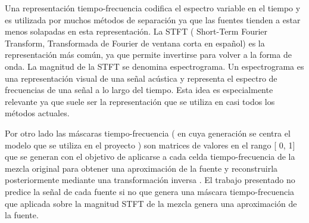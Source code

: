 Una representación tiempo-frecuencia codifica el espectro variable en el tiempo y es utilizada por muchos métodos de separación ya que las fuentes tienden a estar menos solapadas en esta representación.
La STFT ( Short-Term Fourier Transform, Transformada de Fourier de ventana corta en español) es la representación más común, ya que permite invertirse para volver a la forma de onda.
La magnitud de la STFT se denomina espectrograma. Un espectrograma es una representación visual de una señal acústica y representa el espectro de frecuencias de una señal a lo largo del tiempo.
Esta idea es especialmente relevante ya que suele ser la representación que se utiliza en casi todos los métodos actuales.

Por otro lado las máscaras tiempo-frecuencia ( en cuya generación se centra el modelo que se utiliza en el proyecto ) son matrices de valores en el rango [ 0, 1] que se generan con el objetivo de aplicarse a cada celda tiempo-frecuencia de la mezcla original para obtener una aproximación de la fuente y reconstruirla posteriormente mediante una transformación inversa \cite{rafii18}. El trabajo presentado no predice la señal de cada fuente si no que genera una máscara tiempo-frecuencia que aplicada sobre la magnitud STFT de la mezcla genera una aproximación de la fuente.
